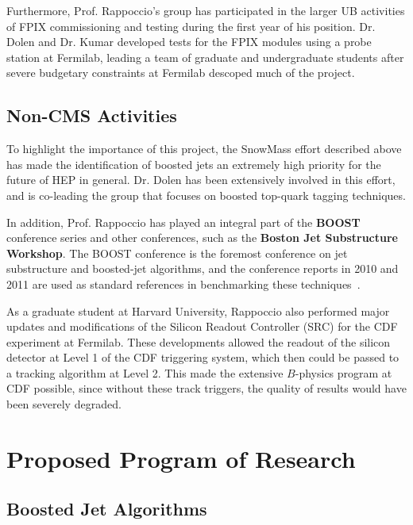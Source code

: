 \documentclass[12pt]{proposalnsf}
\begin{document}
Furthermore, Prof. Rappoccio's group has participated in the larger UB
activities of FPIX commissioning and testing during the first year of
his position. Dr. Dolen and Dr. Kumar developed tests for the FPIX
modules using a probe station at Fermilab, leading a team of graduate
and undergraduate students after severe budgetary constraints at
Fermilab descoped much of the project. 


\subsection{Non-CMS Activities}
To highlight the importance of this project, the SnowMass effort
described above has made the identification of boosted jets an
extremely high priority for the future of HEP in general. Dr. Dolen
has been extensively involved in this effort, and is co-leading the
group that focuses on boosted top-quark tagging techniques. 

In addition, Prof. Rappoccio has played an integral part of the {\bf BOOST}
conference series and other conferences, such as the {\bf Boston Jet
  Substructure Workshop}. The BOOST conference is the foremost
conference on jet substructure and boosted-jet algorithms, and the
conference reports in 2010 and 2011 are used as standard references in
benchmarking these techniques~\cite{boost2010,boost2011}.


As a graduate student at Harvard University, Rappoccio also performed
major updates and modifications of the Silicon Readout Controller
(SRC) for the CDF experiment at Fermilab. These developments allowed
the readout of the silicon detector at Level 1 of the CDF triggering
system, which then could be passed to a tracking algorithm at Level
2. This made the extensive $B$-physics program at CDF possible, since
without these track triggers, the quality of results would have been
severely degraded. 

\section{Proposed Program of Research}

\subsection{Boosted Jet Algorithms}
\label{sec:boostedjets}
\end{document}
